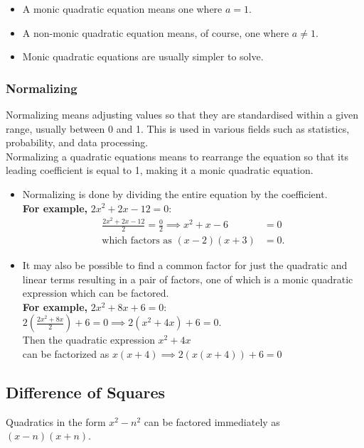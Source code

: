 \documentclass[12pt]{article}
\begin{document}
\begin{itemize}
\item A monic quadratic equation means one where $a=1$.
\item A non-monic quadratic equation means, of course, one where $a\neq1$.
\item Monic quadratic equations are usually simpler to solve.
\end{itemize}

\subsubsection*{Normalizing}
Normalizing means adjusting values so that they are standardised within a given range, usually between 0 and 1. This is used in various fields such as statistics, probability, and data processing.\\

Normalizing a quadratic equations means to rearrange the equation so that its leading coefficient is equal to 1, making it a monic quadratic equation.

\begin{itemize}
\item Normalizing is done by dividing the entire equation by the coefficient.\\

\textbf{For example,} $2x^2+2x-12=0:$
\begin{align*}
\frac{2x^2+2x-12}{2} =\frac{0}{2} \implies  x^2+x-6&=0\\
\textrm{which factors as }(x-2)(x+3)&=0.
\end{align*}

\item It may also be possible to find a common factor for just the quadratic and linear terms resulting in a pair of factors, one of which is a monic quadratic expression which can be factored.\\

\textbf{For example,} $2x^2 + 8x +6 = 0$:\\

$2( \frac{2x^2+8x}{2} ) +6 = 0 \implies 2(x^2 + 4x) +6 = 0.$\\

Then the quadratic expression $x^2+4x$\\can be factorized as $x(x+4) \implies 2(x(x+4))+6=0$
\end{itemize}

\subsection*{Difference of Squares}
Quadratics in the form $x^2 - n^2$ can be factored immediately as $(x - n)(x+n)$.\\
\end{document}
